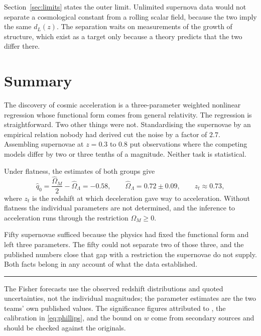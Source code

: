 \documentclass[11pt]{article}
\begin{document}
Section~\ref{sec:limits} states the outer limit.  Unlimited supernova data
would not separate a cosmological constant from a rolling scalar field,
because the two imply the same $d_L(z)$.  The separation waits on measurements
of the growth of structure, which exist as a target only because a theory
predicts that the two differ there.

\section{Summary}

The discovery of cosmic acceleration is a three-parameter weighted nonlinear
regression whose functional form comes from general relativity.  The
regression is straightforward.  Two other things were not.  Standardising the
supernovae by an empirical relation nobody had derived cut the noise by a
factor of $2.7$.  Assembling supernovae at $z = 0.3$ to $0.8$ put observations
where the competing models differ by two or three tenths of a magnitude.
Neither task is statistical.

Under flatness, the estimates of both groups give
\[
  \hat q_0 = \frac{\hat\Omega_M}{2} - \hat\Omega_\Lambda = -0.58,
  \qquad
  \hat\Omega_\Lambda = 0.72 \pm 0.09,
  \qquad
  z_t \approx 0.73 ,
\]
where $z_t$ is the redshift at which deceleration gave way to acceleration.
Without flatness the individual parameters are not determined, and the
inference to acceleration runs through the restriction $\Omega_M \geq 0$.

Fifty supernovae sufficed because the physics had fixed the functional form
and left three parameters.  The fifty could not separate two of those three,
and the published numbers close that gap with a restriction the supernovae do
not supply.  Both facts belong in any account of what the data
established.

\bigskip
\begin{center}\rule{0.4\textwidth}{0.4pt}\end{center}
\smallskip
\noindent\footnotesize
The Fisher forecasts use the observed redshift distributions and quoted
uncertainties, not the individual magnitudes; the parameter estimates are the
two teams' own published values.  The significance figures attributed to
\citet{Riess1998}, the calibration in \eqref{eq:phillips}, and the bound on
$w$ come from secondary sources and should be checked against the originals.

\bigskip


\end{document}
